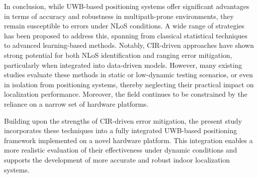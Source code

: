 In conclusion, while UWB-based positioning systems offer significant advantages in terms of accuracy and robustness in multipath-prone environments, they remain susceptible to errors under NLoS conditions. A wide range of strategies has been proposed to address this, spanning from classical statistical techniques to advanced learning-based methods. Notably, CIR-driven approaches have shown strong potential for both NLoS identification and ranging error mitigation, particularly when integrated into data-driven models. However, many existing studies evaluate these methods in static or low-dynamic testing scenarios, or even in isolation from positioning systems, thereby neglecting their practical impact on localization performance. Moreover, the field continues to be constrained by the reliance on a narrow set of hardware platforms.

Building upon the strengths of CIR-driven error mitigation, the present study incorporates these techniques into a fully integrated UWB-based positioning framework implemented on a novel hardware platform. This integration enables a more realistic evaluation of their effectiveness under dynamic conditions and supports the development of more accurate and robust indoor localization systems.
